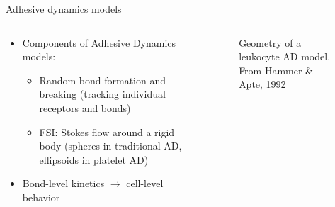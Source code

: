 \documentclass[10pt]{beamer}
\begin{document}
\begin{frame}{Adhesive dynamics models}
\begin{columns}
  \begin{column}{.5\textwidth}
    \begin{itemize}
    \item Components of Adhesive Dynamics models:
      \begin{itemize}
      \item Random bond formation and breaking (tracking individual
        receptors and bonds)
      \item FSI: Stokes flow around a rigid body (spheres in
        traditional AD, ellipsoids in platelet AD)
      \end{itemize}
    \item Bond-level kinetics $\rightarrow$ cell-level behavior
    \end{itemize}
  \end{column}

  \begin{column}{.5\textwidth}
    \begin{figure}
      \centering
      \caption{Geometry of a leukocyte AD model. From Hammer \&
        Apte, 1992}
      \label{fig:hammer-diagram}
    \end{figure}
  \end{column}
\end{columns}
\end{frame}
\end{document}
